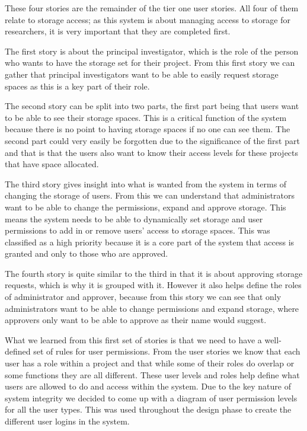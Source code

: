 \documentclass[a4paper,titlepage,12pt]{article}
\begin{document}
These four stories are the remainder of the tier one user stories. All four of
them relate to storage access; as this system is about managing access to
storage for researchers, it is very important that they are completed first.

The first story is about the principal investigator, which is the role of the
person who wants to have the storage set for their project. From this first
story we can gather that principal investigators want to be able to easily
request storage spaces as this is a key part of their role.

The second story can be split into two parts, the first part being that users
want to be able to see their storage spaces. This is a critical function of the
system because there is no point to having storage spaces if no one can see
them. The second part could very easily be forgotten due to the significance of
the first part and that is that the users also want to know their access levels
for these projects that have space allocated.

The third story gives insight into what is wanted from the system in terms of
changing the storage of users. From this we can understand that administrators
want to be able to change the permissions, expand and approve storage. This
means the system needs to be able to dynamically set storage and user
permissions to add in or remove users' access to storage spaces. This was
classified as a high priority because it is a core part of the system that
access is granted and only to those who are approved.

The fourth story is quite similar to the third in that it is about approving
storage requests, which is why it is grouped with it. However it also helps
define the roles of administrator and approver, because from this story we can
see that only administrators want to be able to change permissions and expand
storage, where approvers only want to be able to approve as their name would
suggest.

What we learned from this first set of stories is that we need to have a
well-defined set of rules for user permissions. From the user stories we know
that each user has a role within a project and that while some of their roles
do overlap or some functions they are all different. These user levels and
roles help define what users are allowed to do and access within the system.
Due to the key nature of system integrity we decided to come up with a diagram
of user permission levels for all the user types. This was used throughout the
design phase to create the different user logins in the system.
\end{document}
